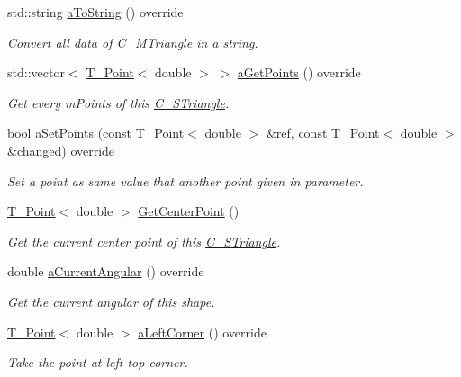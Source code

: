 \begin{DoxyCompactItemize}
std\+::string \hyperlink{classC__STriangle_a1ea089f6a82c2770e0529c4a9fc07d90}{a\+To\+String} () override
\begin{DoxyCompactList}\small\item\em Convert all data of \hyperlink{classC__MTriangle}{C\+\_\+\+M\+Triangle} in a string. \end{DoxyCompactList}\item 
std\+::vector$<$ \hyperlink{classT__Point}{T\+\_\+\+Point}$<$ double $>$ $>$ \hyperlink{classC__STriangle_a6d0d4f162b755ed9886907e6d87784cf}{a\+Get\+Points} () override
\begin{DoxyCompactList}\small\item\em Get every m\+Points of this \hyperlink{classC__STriangle}{C\+\_\+\+S\+Triangle}. \end{DoxyCompactList}\item 
bool \hyperlink{classC__STriangle_a431802d5e10b69f535e7929a23963b5e}{a\+Set\+Points} (const \hyperlink{classT__Point}{T\+\_\+\+Point}$<$ double $>$ \&ref, const \hyperlink{classT__Point}{T\+\_\+\+Point}$<$ double $>$ \&changed) override
\begin{DoxyCompactList}\small\item\em Set a point as same value that another point given in parameter. \end{DoxyCompactList}\item 
\hyperlink{classT__Point}{T\+\_\+\+Point}$<$ double $>$ \hyperlink{classC__STriangle_a74bf0469da4e3a20ad272ce9b39f3537}{Get\+Center\+Point} ()
\begin{DoxyCompactList}\small\item\em Get the current center point of this \hyperlink{classC__STriangle}{C\+\_\+\+S\+Triangle}. \end{DoxyCompactList}\item 
double \hyperlink{classC__STriangle_a38304830925938339c4a4a0ad812e151}{a\+Current\+Angular} () override
\begin{DoxyCompactList}\small\item\em Get the current angular of this shape. \end{DoxyCompactList}\item 
\hyperlink{classT__Point}{T\+\_\+\+Point}$<$ double $>$ \hyperlink{classC__STriangle_a81494ca6aa210194c55e884b0ff68db1}{a\+Left\+Corner} () override
\begin{DoxyCompactList}\small\item\em Take the point at left top corner. \end{DoxyCompactList}\item 

\end{DoxyCompactItemize}
